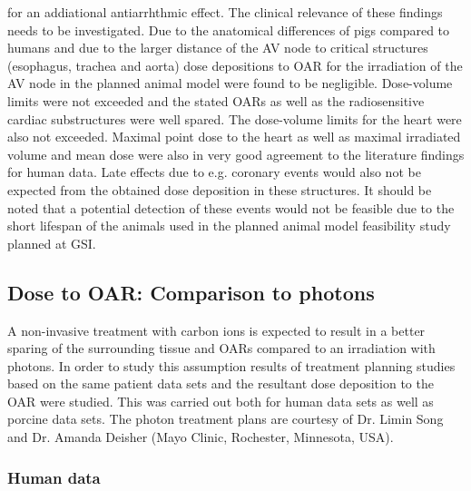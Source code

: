 for an addiational antiarrhthmic effect. The clinical relevance of these findings needs to be investigated.\newline
\newline
Due to the anatomical differences of pigs compared to humans and due to the larger distance of the AV node to critical structures (esophagus, 
trachea and aorta) dose depositions to OAR for the irradiation of the AV node in the planned animal model were found to be negligible. 
Dose-volume limits were not exceeded and the stated OARs as well as the radiosensitive cardiac substructures were well spared. 
The dose-volume limits for the heart were also not exceeded. Maximal point dose to the heart as well as maximal irradiated volume and 
mean dose were also in very good agreement to the literature findings for human data. Late effects due to e.g. coronary events would 
also not be expected from the obtained dose deposition in these structures. It should be noted that a potential detection of these events 
would not be feasible due to the short lifespan of the animals used in the planned animal model feasibility study planned at GSI.


\subsection{Dose to OAR: Comparison to photons}
\label{Dose:OAR:photons}

A non-invasive treatment with carbon ions is expected to result in a better sparing of the surrounding tissue and OARs compared to an 
irradiation with photons. In order to study this assumption results of treatment planning studies based on the same patient data sets 
and the resultant dose deposition to the OAR were studied. This was carried out both for human data sets as well as porcine data sets. 
The photon treatment plans are courtesy of Dr. Limin Song and Dr. Amanda Deisher (Mayo Clinic, Rochester, Minnesota, USA).  

\subsubsection{Human data}

